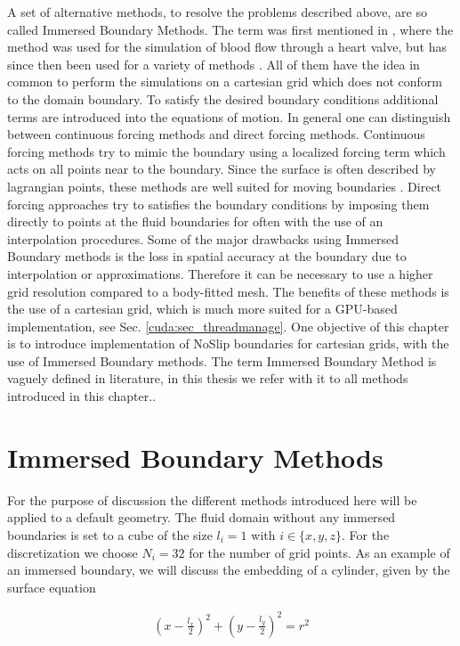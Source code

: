 A set of alternative methods, to resolve the problems described above, are so called Immersed Boundary Methods.
The term was first mentioned in \citep{peskin72}, where the method was used for the simulation of blood flow through a heart valve,
but has since then been used for a variety of methods \citep{Mittal2005}.
All of them have the idea in common to perform the simulations on a cartesian grid which does not conform to the domain boundary.
To satisfy the desired boundary conditions additional terms are introduced into the equations of motion.
In general one can distinguish between continuous forcing methods and direct forcing methods.
Continuous forcing methods try to mimic the boundary using a localized forcing term which acts on all points near to the boundary.
Since the surface is often described by lagrangian points, these methods are well suited for moving boundaries \citep{Mittal2005}.
Direct forcing approaches try to satisfies the boundary conditions by imposing them directly to points at the fluid boundaries for often with the use of an interpolation procedures.
Some of the major drawbacks using Immersed Boundary methods is the loss in  spatial accuracy at the boundary due to interpolation or approximations. Therefore it can be necessary to use a higher grid resolution
compared to a body-fitted mesh.
The benefits of these methods is the use of a cartesian grid, which is much more suited for a GPU-based implementation, see Sec. \ref{cuda:sec_threadmanage}.
One objective of this chapter is to introduce implementation of NoSlip boundaries for cartesian grids, with the use of Immersed Boundary methods.
The term Immersed Boundary Method is vaguely defined in literature, in this thesis we refer with it to all methods introduced in this chapter..

\section{Immersed Boundary Methods}

For the purpose of discussion the different methods introduced here will be applied to a default geometry.
The fluid domain without any immersed boundaries is set to a cube of the size $l_i= 1$ with  $i \in \{x, y, z\}$.
For the discretization we choose $N_i = 32$ for the number of grid points.
As an example of an immersed boundary, we will discuss the embedding of a cylinder, given by the  surface equation

\begin{align}
    \label{ibm:eq_cylinder_intro}
    \left(x - \frac{l_x}{2}\right)^2 + \left(y - \frac{l_y}{2}\right)^2 = r^2
\end{align}

